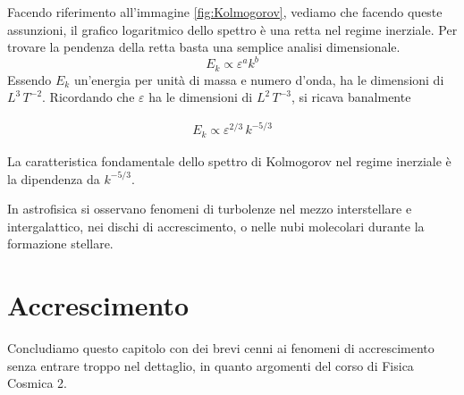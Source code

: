 Facendo riferimento all'immagine \ref{fig:Kolmogorov}, vediamo che facendo queste assunzioni, il grafico logaritmico dello spettro è una retta nel regime inerziale. Per trovare la pendenza della retta basta una semplice analisi dimensionale.
\begin{equation}
E_k \propto \varepsilon^a k^b
\end{equation}
Essendo $E_k$ un'energia per unità di massa e numero d'onda, ha le dimensioni di $L^3\, T^{-2}$. Ricordando che $\varepsilon$ ha le dimensioni di $L^2 \,T^{-3}$, si ricava banalmente
\begin{EQ}
\begin{align}
E_k \propto \varepsilon^{2/3}\,k^{-5/3}
\end{align}
\end{EQ}
La caratteristica fondamentale dello spettro di Kolmogorov nel regime inerziale è la dipendenza da $k^{-5/3}$.

In astrofisica si osservano fenomeni di turbolenze nel mezzo interstellare e intergalattico, nei dischi di accrescimento, o nelle nubi molecolari durante la formazione stellare.

\section{Accrescimento}
Concludiamo questo capitolo con dei brevi cenni ai fenomeni di accrescimento senza entrare troppo nel dettaglio, in quanto argomenti del corso di Fisica Cosmica 2.

